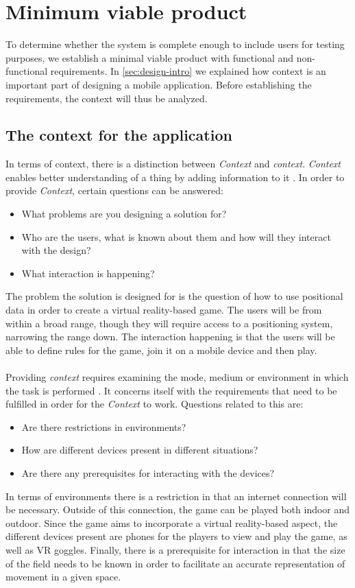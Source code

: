 \section{Minimum viable product}\label{sec:mvp}
To determine whether the system is complete enough to include users for testing purposes, we establish a minimal viable product with functional and non-functional requirements.
In \autoref{sec:design-intro} we explained how context is an important part of designing a mobile application.
Before establishing the requirements, the context will thus be analyzed.

\subsection{The context for the application}\label{subsec:context}
In terms of context, there is a distinction between \textit{Context} and \textit{context}.
\textit{Context} enables better understanding of a thing by adding information to it \cite{MobileDesign}.
In order to provide \textit{Context}, certain questions can be answered:
\begin{itemize}
    \item What problems are you designing a solution for?
    \item Who are the users, what is known about them and how will they interact with the design?
    \item What interaction is happening?
\end{itemize}
The problem the solution is designed for is the question of how to use positional data in order to create a virtual reality-based game.
The users will be from within a broad range, though they will require access to a positioning system, narrowing the range down.
The interaction happening is that the users will be able to define rules for the game, join it on a mobile device and then play.
\\\\
Providing \textit{context} requires examining the mode, medium or environment in which the task is performed \cite{MobileDesign}.
It concerns itself with the requirements that need to be fulfilled in order for the \textit{Context} to work.
Questions related to this are:
\begin{itemize}
    \item Are there restrictions in environments?
    \item How are different devices present in different situations?
    \item Are there any prerequisites for interacting with the devices?
\end{itemize}
In terms of environments there is a restriction in that an internet connection will be necessary.
Outside of this connection, the game can be played both indoor and outdoor.
Since the game aims to incorporate a virtual reality-based aspect, the different devices present are phones for the players to view and play the game, as well as VR goggles.
Finally, there is a prerequisite for interaction in that the size of the field needs to be known in order to facilitate an accurate representation of movement in a given space.


